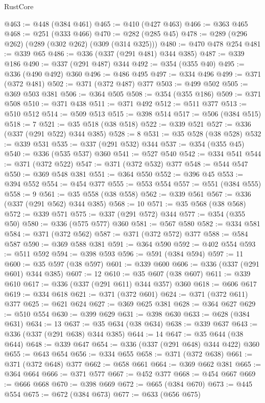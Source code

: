\begin{lexlean}{RustCore}
\begin{coremodule}
@463 := @448 (@384 @461)
@465 := @410 (@427 @463)
@466 := @363 @465
@468 := @251 (@333 @466)
@470 := @282 (@285 @45)
@478 := @289 (@296 @262) (@289 (@302 @262) (@309 (@314 @325)))
@480 := @470 @478 @254
@481 := @339 @65
@486 := @336 (@337 (@291 @481) @344 @385)
@487 := @339 @186
@490 := @337 (@291 @487) @344
@492 := @354 (@355 @40)
@495 := @336 (@490 @492) @360
@496 := @486 @495
@497 := @334 @496
@499 := @371 (@372 @481)
@502 := @371 (@372 @487) @377
@503 := @499 @502
@505 := @369 @503 @381
@506 := @364 @505
@508 := @354 (@355 @186)
@509 := @371 @508
@510 := @371 @438
@511 := @371 @492
@512 := @511 @377
@513 := @510 @512
@514 := @509 @513
@515 := @398 @514
@517 := @506 (@384 @515)
@518 := 7
@521 := @35 @518 (@38 @518)
@522 := @339 @521
@527 := @336 (@337 (@291 @522) @344 @385)
@528 := 8
@531 := @35 @528 (@38 @528)
@532 := @339 @531
@535 := @337 (@291 @532) @344
@537 := @354 (@355 @45)
@540 := @336 (@535 @537) @360
@541 := @527 @540
@542 := @334 @541
@544 := @371 (@372 @522)
@547 := @371 (@372 @532) @377
@548 := @544 @547
@550 := @369 @548 @381
@551 := @364 @550
@552 := @396 @45
@553 := @394 @552
@554 := @454 @377
@555 := @553 @554
@557 := @551 (@384 @555)
@558 := 9
@561 := @35 @558 (@38 @558)
@562 := @339 @561
@567 := @336 (@337 (@291 @562) @344 @385)
@568 := 10
@571 := @35 @568 (@38 @568)
@572 := @339 @571
@575 := @337 (@291 @572) @344
@577 := @354 (@355 @50)
@580 := @336 (@575 @577) @360
@581 := @567 @580
@582 := @334 @581
@584 := @371 (@372 @562)
@587 := @371 (@372 @572) @377
@588 := @584 @587
@590 := @369 @588 @381
@591 := @364 @590
@592 := @402 @554
@593 := @511 @592
@594 := @398 @593
@596 := @591 (@384 @594)
@597 := 11
@600 := @35 @597 (@38 @597)
@601 := @339 @600
@606 := @336 (@337 (@291 @601) @344 @385)
@607 := 12
@610 := @35 @607 (@38 @607)
@611 := @339 @610
@617 := @336 (@337 (@291 @611) @344 @357) @360
@618 := @606 @617
@619 := @334 @618
@621 := @371 (@372 @601)
@624 := @371 (@372 @611) @377
@625 := @621 @624
@627 := @369 @625 @381
@628 := @364 @627
@629 := @510 @554
@630 := @399 @629
@631 := @398 @630
@633 := @628 (@384 @631)
@634 := 13
@637 := @35 @634 (@38 @634)
@638 := @339 @637
@643 := @336 (@337 (@291 @638) @344 @385)
@644 := 14
@647 := @35 @644 (@38 @644)
@648 := @339 @647
@654 := @336 (@337 (@291 @648) @344 @422) @360
@655 := @643 @654
@656 := @334 @655
@658 := @371 (@372 @638)
@661 := @371 (@372 @648) @377
@662 := @658 @661
@664 := @369 @662 @381
@665 := @364 @664
@666 := @371 @577
@667 := @452 @377
@668 := @454 @667
@669 := @666 @668
@670 := @398 @669
@672 := @665 (@384 @670)
@673 := @445 @554
@675 := @672 (@384 @673)
@677 := @633 (@656 @675)

\end{coremodule}
\end{lexlean}
